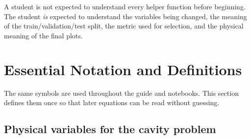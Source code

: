 \documentclass[11pt]{article}
\begin{document}
\begin{summarybox}
A student is not expected to understand every helper function before beginning. The student \emph{is} expected to understand the variables being changed, the meaning of the train/validation/test split, the metric used for selection, and the physical meaning of the final plots.
\end{summarybox}

\section{Essential Notation and Definitions}
The same symbols are used throughout the guide and notebooks. This section defines them once so that later equations can be read without guessing.

\subsection{Physical variables for the cavity problem}
\end{document}
